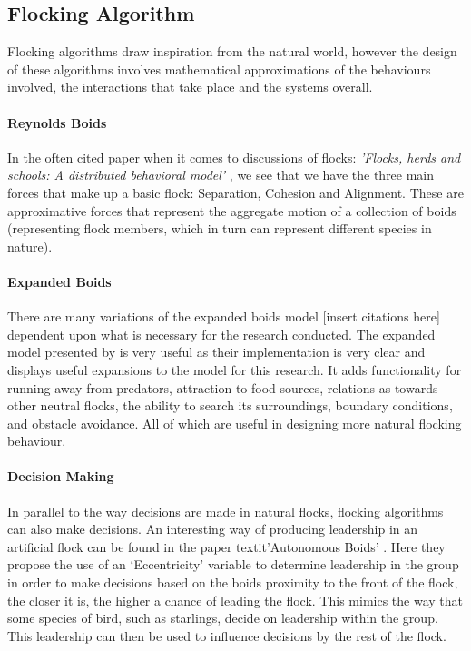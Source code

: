 \subsection{Flocking Algorithm}
Flocking algorithms draw inspiration from the natural world, however the design of these algorithms involves mathematical approximations of the behaviours involved, the interactions that take place and the systems overall.

	\paragraph{Reynolds Boids}
	In the often cited paper when it comes to discussions of flocks: \textit{'Flocks, herds and schools: A distributed behavioral model'} \citet{Reynolds:1987:FHS:37402.37406}, we see that we have the three main forces that make up a basic flock: Separation, Cohesion and Alignment. These are approximative forces that represent the aggregate motion of a collection of boids (representing flock members, which in turn can represent different species in nature).
	
	\paragraph{Expanded Boids} %
	There are many variations of the expanded boids model [insert citations here] dependent upon what is necessary for the research conducted. The expanded model presented by \citet{4604156} is very useful as their implementation is very clear and displays useful expansions to the model for this research. It adds functionality for running away from predators, attraction to food sources, relations as towards other neutral flocks, the ability to search its surroundings, boundary conditions, and obstacle avoidance. All of which are useful in designing more natural flocking behaviour.
	
	\paragraph{Decision Making}
	In parallel to the way decisions are made in natural flocks, flocking algorithms can also make decisions. An interesting way of producing leadership in an artificial flock can be found in the paper textit{'Autonomous Boids’} \citet{HartmanC2006Ab}. Here they propose the use of an ‘Eccentricity’ variable to determine leadership in the group in order to make decisions based on the boids proximity to the front of the flock, the closer it is, the higher a chance of leading the flock. This mimics the way that some species of bird, such as starlings, decide on leadership within the group. This leadership can then be used to influence decisions by the rest of the flock.
	
